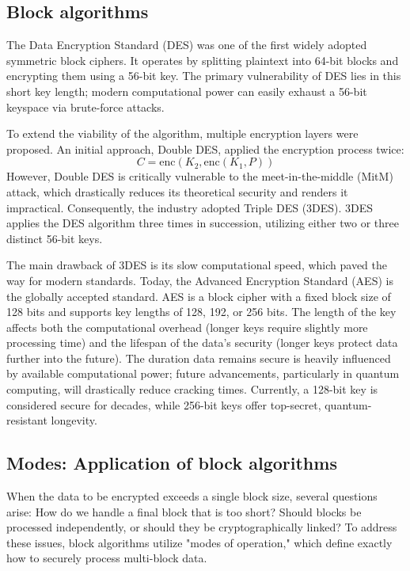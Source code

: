 
\subsection{Block algorithms}
The Data Encryption Standard (DES) was one of the first widely adopted symmetric block ciphers. It operates by splitting plaintext into 64-bit blocks and encrypting them using a 56-bit key.
The primary vulnerability of DES lies in this short key length; modern computational power can easily exhaust a 56-bit keyspace via brute-force attacks.

To extend the viability of the algorithm, multiple encryption layers were proposed. An initial approach, Double DES, applied the encryption process twice:
$$C = \text{enc}(K_2, \text{enc}(K_1, P))$$
However, Double DES is critically vulnerable to the meet-in-the-middle (MitM) attack, which drastically reduces its theoretical security and renders it impractical.
Consequently, the industry adopted Triple DES (3DES). 3DES applies the DES algorithm three times in succession, utilizing either two or three distinct 56-bit keys.

The main drawback of 3DES is its slow computational speed, which paved the way for modern standards. Today, the Advanced Encryption Standard (AES) is the globally accepted standard. AES is a block cipher with a fixed block size of 128 bits and supports key lengths of 128, 192, or 256 bits.
The length of the key affects both the computational overhead (longer keys require slightly more processing time) and the lifespan of the data's security (longer keys protect data further into the future). The duration data remains secure is heavily influenced by available computational power; future advancements, particularly in quantum computing, will drastically reduce cracking times. Currently, a 128-bit key is considered secure for decades, while 256-bit keys offer top-secret, quantum-resistant longevity.

\subsection{Modes: Application of block algorithms}
When the data to be encrypted exceeds a single block size, several questions arise: How do we handle a final block that is too short? Should blocks be processed independently, or should they be cryptographically linked?
To address these issues, block algorithms utilize "modes of operation," which define exactly how to securely process multi-block data.

